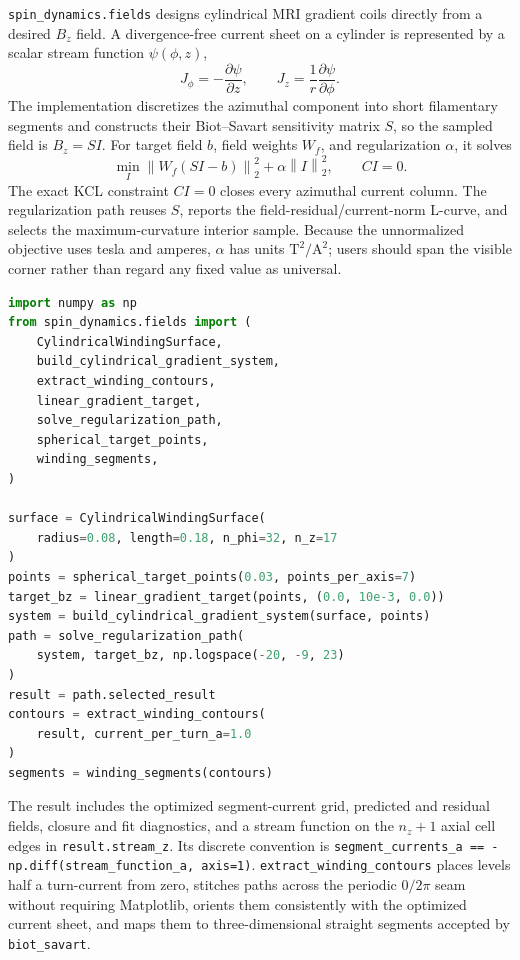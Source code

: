 \documentclass[11pt,oneside]{report}
\newcommand{\code}[1]{\texttt{#1}}
\begin{document}
\code{spin\_dynamics.fields} designs cylindrical MRI gradient coils directly
from a desired \(B_z\) field. A divergence-free current sheet on a cylinder is
represented by a scalar stream function \(\psi(\phi,z)\),
\[
J_\phi=-\frac{\partial\psi}{\partial z},\qquad
J_z=\frac{1}{r}\frac{\partial\psi}{\partial\phi}.
\]
The implementation discretizes the azimuthal component into short filamentary
segments and constructs their Biot--Savart sensitivity matrix \(S\), so the
sampled field is \(B_z=SI\). For target field \(b\), field weights \(W_f\), and
regularization \(\alpha\), it solves
\[
\min_I \left\|W_f(SI-b)\right\|_2^2
       +\alpha\left\|I\right\|_2^2,
\qquad CI=0.
\]
The exact KCL constraint \(CI=0\) closes every azimuthal current column. The
regularization path reuses \(S\), reports the field-residual/current-norm
L-curve, and selects the maximum-curvature interior sample. Because the
unnormalized objective uses tesla and amperes, \(\alpha\) has units
\(\mathrm{T}^2/\mathrm{A}^2\); users should span the visible corner rather than
regard any fixed value as universal.

\begin{lstlisting}[language=Python]
import numpy as np
from spin_dynamics.fields import (
    CylindricalWindingSurface,
    build_cylindrical_gradient_system,
    extract_winding_contours,
    linear_gradient_target,
    solve_regularization_path,
    spherical_target_points,
    winding_segments,
)

surface = CylindricalWindingSurface(
    radius=0.08, length=0.18, n_phi=32, n_z=17
)
points = spherical_target_points(0.03, points_per_axis=7)
target_bz = linear_gradient_target(points, (0.0, 10e-3, 0.0))
system = build_cylindrical_gradient_system(surface, points)
path = solve_regularization_path(
    system, target_bz, np.logspace(-20, -9, 23)
)
result = path.selected_result
contours = extract_winding_contours(
    result, current_per_turn_a=1.0
)
segments = winding_segments(contours)
\end{lstlisting}

The result includes the optimized segment-current grid, predicted and residual
fields, closure and fit diagnostics, and a stream function on the \(n_z+1\)
axial cell edges in \code{result.stream\_z}. Its discrete convention is
\code{segment\_currents\_a == -np.diff(stream\_function\_a, axis=1)}.
\code{extract\_winding\_contours} places levels half a turn-current from zero,
stitches paths across the periodic \(0/2\pi\) seam without requiring Matplotlib,
orients them consistently with the optimized current sheet, and maps them to
three-dimensional straight segments accepted by \code{biot\_savart}.
\end{document}
